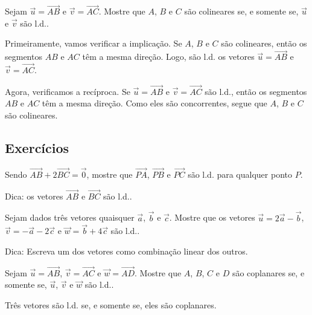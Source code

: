 \begin{exeresol}
  Sejam $\vec{u} = \overrightarrow{AB}$ e $\vec{v} = \overrightarrow{AC}$. Mostre que $A$, $B$ e $C$ são colineares se, e somente se, $\vec{u}$ e $\vec{v}$ são l.d..
\end{exeresol}
\begin{resol}
  Primeiramente, vamos verificar a implicação. Se $A$, $B$ e $C$ são colineares, então os segmentos $AB$ e $AC$ têm a mesma direção. Logo, são l.d. os vetores $\vec{u} = \overrightarrow{AB}$ e $\vec{v} = \overrightarrow{AC}$.

  Agora, verificamos a recíproca. Se $\vec{u} = \overrightarrow{AB}$ e $\vec{v} = \overrightarrow{AC}$ são l.d., então os segmentos $AB$ e $AC$ têm a mesma direção. Como eles são concorrentes, segue que $A$, $B$ e $C$ são colineares.
\end{resol}

\subsection*{Exercícios}

\begin{exer}
  Sendo $\overrightarrow{AB} + 2\overrightarrow{BC} = \vec{0}$, mostre que $\overrightarrow{PA}$, $\overrightarrow{PB}$ e $\overrightarrow{PC}$ são l.d. para qualquer ponto $P$.
\end{exer}
\begin{resp}
  Dica: os vetores $\overrightarrow{AB}$ e $\overrightarrow{BC}$ são l.d..
\end{resp}

\begin{exer}
  Sejam dados três vetores quaisquer $\vec{a}$, $\vec{b}$ e $\vec{c}$. Mostre que os vetores $\vec{u} = 2\vec{a}-\vec{b}$, $\vec{v}=-\vec{a}-2\vec{c}$ e $\vec{w}=\vec{b}+4\vec{c}$ são l.d..
\end{exer}
\begin{resp}
  Dica: Escreva um dos vetores como combinação linear dos outros.
\end{resp}

\begin{exer}
  Sejam $\vec{u} = \overrightarrow{AB}$, $\vec{v} = \overrightarrow{AC}$ e $\vec{w} = \overrightarrow{AD}$. Mostre que $A$, $B$, $C$ e $D$ são coplanares se, e somente se, $\vec{u}$, $\vec{v}$ e $\vec{w}$ são l.d..
\end{exer}
\begin{resp}
  Três vetores são l.d. se, e somente se, eles são coplanares.
\end{resp}


